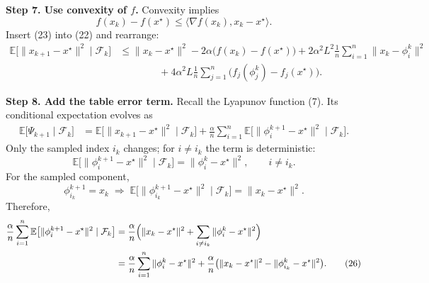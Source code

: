 \documentclass{article}
\begin{document}
\noindent\textbf{Step 7. Use convexity of $f$.}
Convexity implies
\[
f(x_k)-f(x^\star) \le \langle\nabla f(x_k),x_k-x^\star\rangle .
\tag{23}
\]
Insert (23) into (22) and rearrange:
\begin{align}
\mathbb{E}\bigl[\|x_{k+1}-x^\star\|^2\mid\mathcal{F}_k\bigr]
&\le \|x_k-x^\star\|^2 -2\alpha\bigl(f(x_k)-f(x^\star)\bigr)
   +2\alpha^2 L^2\frac{1}{n}\sum_{i=1}^{n}\|x_k-\phi_i^{k}\|^2 \nonumber\\
&\qquad\qquad
   +4\alpha^2 L\frac{1}{n}\sum_{j=1}^{n}\bigl(f_j(\phi_j^{k})-f_j(x^\star)\bigr) .
\tag{24}
\end{align}

\noindent\textbf{Step 8. Add the table error term.}
Recall the Lyapunov function (7). Its conditional expectation evolves as
\begin{align}
\mathbb{E}\bigl[\Psi_{k+1}\mid\mathcal{F}_k\bigr]
&= \mathbb{E}\bigl[\|x_{k+1}-x^\star\|^2\mid\mathcal{F}_k\bigr]
   +\frac{\alpha}{n}\sum_{i=1}^{n}
        \mathbb{E}\bigl[\|\phi_i^{k+1}-x^\star\|^2\mid\mathcal{F}_k\bigr].
\tag{25}
\end{align}
Only the sampled index $i_k$ changes; for $i\neq i_k$ the term is
deterministic:
\[
\mathbb{E}\bigl[\|\phi_i^{k+1}-x^\star\|^2\mid\mathcal{F}_k\bigr]
   = \|\phi_i^{k}-x^\star\|^2 ,\qquad i\neq i_k .
\]
For the sampled component,
\[
\phi_{i_k}^{k+1}=x_k\;\Longrightarrow\;
\mathbb{E}\bigl[\|\phi_{i_k}^{k+1}-x^\star\|^2\mid\mathcal{F}_k\bigr]
   =\|x_k-x^\star\|^2 .
\]
Therefore,
\begin{align}
\frac{\alpha}{n}\sum_{i=1}^{n}
\mathbb{E}\bigl[\|\phi_i^{k+1}-x^\star\|^2\mid\mathcal{F}_k\bigr]
&= \frac{\alpha}{n}\Bigl(\|x_k-x^\star\|^2
   +\sum_{i\neq i_k}\|\phi_i^{k}-x^\star\|^2\Bigr) \nonumber\\
&= \frac{\alpha}{n}\sum_{i=1}^{n}\|\phi_i^{k}-x^\star\|^2
   +\frac{\alpha}{n}\bigl(\|x_k-x^\star\|^2-\|\phi_{i_k}^{k}-x^\star\|^2\bigr).
\tag{26}
\end{align}
\end{document}
